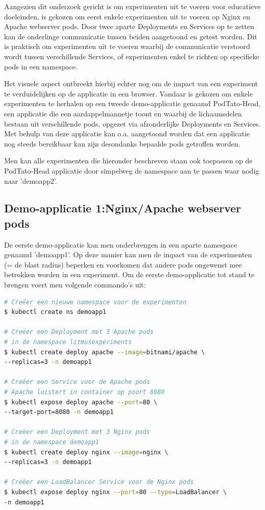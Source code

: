 Aangezien dit onderzoek gericht is om experimenten uit te voeren voor educatieve doeleinden, is gekozen om eerst enkele experimenten uit te voeren op Nginx en Apache webserver pods. Door twee aparte Deployments en Services op te zetten kan de onderlinge communicatie tussen beiden aangetoond en getest worden. Dit is praktisch om experimenten uit te voeren waarbij de communicatie verstoord wordt tussen verschillende Services, of experimenten enkel te richten op specifieke pods in een namespace. 

Het visuele aspect ontbreekt hierbij echter nog om de impact van een experiment te verduidelijken op de applicatie in een browser. Vandaar is gekozen om enkele experimenten te herhalen op een tweede demo-applicatie genaamd PodTato-Head, een applicatie die een aardappelmannetje toont en waarbij de lichaamsdelen bestaan uit verschillende pods, opgezet via afzonderlijke Deployments en Services. Met behulp van deze applicatie kan o.a. aangetoond worden dat een applicatie nog steeds bereikbaar kan zijn desondanks bepaalde pods getroffen worden.

Men kan alle experimenten die hieronder beschreven staan ook toepassen op de PodTato-Head applicatie door simpelweg de namespace aan te passen waar nodig naar 'demoapp2'.

\subsection{Demo-applicatie 1:Nginx/Apache webserver pods}

De eerste demo-applicatie kan men onderbrengen in een aparte namespace genaamd 'demoapp1'. Op deze manier kan men de impact van de experimenten (= de blast radius) beperken en voorkomen dat andere pods ongewenst mee betrokken worden in een experiment. Om de eerste demo-applicatie tot stand te brengen voert men volgende commando's uit: 
\begin{lstlisting}[language=bash]
# Creëer een nieuwe namespace voor de experimenten
$ kubectl create ns demoapp1

# Creëer een Deployment met 3 Apache pods
# in de namespace litmusexperiments
$ kubectl create deploy apache --image=bitnami/apache \
--replicas=3 -n demoapp1

# Creëer een Service voor de Apache pods
# Apache luistert in container op poort 8080
$ kubectl expose deploy apache --port=80 \
--target-port=8080 -n demoapp1

# Creëer een Deployment met 3 Nginx pods 
# in de namespace demoapp1
$ kubectl create deploy nginx --image=nginx \
--replicas=3 -n demoapp1

# Creëer een LoadBalancer Service voor de Nginx pods
$ kubectl expose deploy nginx --port=80 --type=LoadBalancer \
-n demoapp1

\end{lstlisting} 

